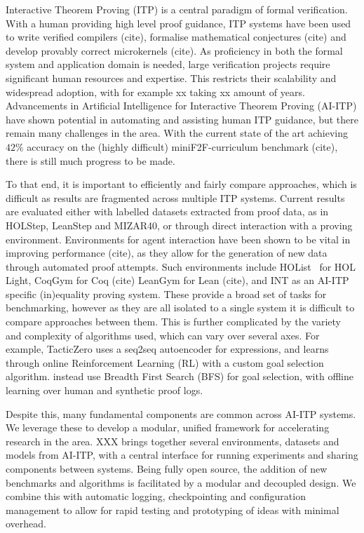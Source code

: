 \documentclass[letterpaper]{article} %
\begin{document}
    Interactive Theorem Proving (ITP) is a central paradigm of formal verification.
    With a human providing high level proof guidance, ITP systems have been used to write verified compilers (cite),
    formalise mathematical conjectures (cite) and develop provably correct microkernels (cite).
    As proficiency in both the formal system and application domain is needed,
    large verification projects require significant human resources and expertise.
    This restricts their scalability and widespread adoption, with for example xx taking xx amount of years.
    Advancements in Artificial Intelligence for Interactive Theorem Proving (AI-ITP) have shown potential in automating
    and assisting human ITP guidance, but there remain many challenges in the area.
    With the current state of the art achieving $42\%$ accuracy on the (highly difficult) miniF2F-curriculum benchmark (cite),
    there is still much progress to be made.


    To that end, it is important to efficiently and fairly compare approaches,
    which is difficult as results are fragmented across multiple ITP systems.
    Current results are evaluated either with labelled datasets extracted from proof data, as in HOLStep, LeanStep and MIZAR40,
    or through direct interaction with a proving environment.
    Environments for agent interaction have been shown to be vital in improving performance (cite),
    as they allow for the generation of new data through automated proof attempts.
    Such environments include HOList~\cite{bansal_holist_2019} for HOL Light, CoqGym for Coq (cite)
    LeanGym for Lean (cite), and INT as an AI-ITP specific (in)equality proving system.
    These provide a broad set of tasks for benchmarking, however as they are all isolated to a single system
    it is difficult to compare approaches between them.
    This is further complicated by the variety and complexity of algorithms used, which can vary over several axes.
    For example, TacticZero \cite{wu_tacticzero_2021} uses a seq2seq autoencoder for expressions,
    and learns through online Reinforcement Learning (RL) with a custom goal selection algorithm.
    \cite{bansal_holist_2019} instead use Breadth First Search (BFS) for goal selection,
    with offline learning over human and synthetic proof logs.

    Despite this, many fundamental components are common across AI-ITP systems.
    We leverage these to develop a modular, unified framework for accelerating research in the area.
    XXX brings together several environments, datasets and models from AI-ITP, with a central interface
    for running experiments and sharing components between systems.
    Being fully open source, the addition of new benchmarks and algorithms is facilitated
    by a modular and decoupled design.
    We combine this with automatic logging, checkpointing and configuration management
    to allow for rapid testing and prototyping of ideas with minimal overhead.
\end{document}
